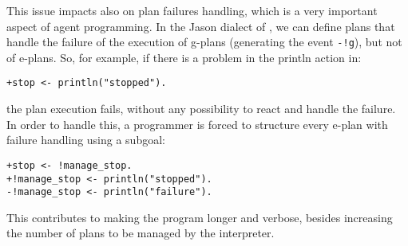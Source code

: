 %
%


This issue impacts also on plan failures handling, which is a very
important aspect of agent programming.
%
In the Jason dialect of {\asl}, we can define plans that handle the
failure of the execution of g-plans (generating the event
\texttt{-!g}), but not of e-plans.
%
So, for example, if there is a problem in the println action in:

\begin{small}
\begin{verbatim}
+stop <- println("stopped").
\end{verbatim}
\end{small}

\noindent the plan execution fails, without any possibility to react
and handle the failure.
%
In order to handle this, a programmer is forced to structure every
e-plan with failure handling using a subgoal:

\begin{small}
\begin{verbatim}
+stop <- !manage_stop.
+!manage_stop <- println("stopped").
-!manage_stop <- println("failure").
\end{verbatim}
\end{small}

\noindent This contributes to making the program longer and verbose,
besides increasing the number of plans to be managed by the
interpreter.

